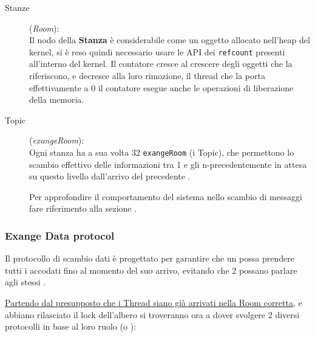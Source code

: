 \begin{description}
\item[Stanze] (\textit{Room}):\\
        Il nodo della \textbf{Stanza} è considerabile come un oggetto allocato nell'heap del kernel, si è reso
        quindi necessario usare le API dei \texttt{refcount} presenti all'interno del kernel. Il contatore cresce al
        crescere    degli oggetti che la riferiscono, e decresce alla loro rimozione, il thread che la porta
        effettivamente a 0 il contatore esegue anche le operazioni di liberazione della memoria.

\item[Topic] (\textit{exangeRoom}):\\
    Ogni stanza ha a sua volta 32 \texttt{exangeRoom} (i Topic), che permettono lo scambio effettivo delle informazioni
    tra 1 \Writer e gli n-\Reader precedentemente in attesa su questo livello dall'arrivo del precedente \Writer.

    Per approfondire il comportamento del sistema nello scambio di messaggi fare riferimento alla sezione
    .


\end{description}

\newpage

\subsubsection{Exange Data protocol} \label{exangeDataProtocol}

Il protocollo di scambio dati è progettato per garantire che un \Writer possa prendere tutti i \Reader accodati fino al
momento del suo arrivo, evitando che 2 \Writer possano parlare agli stessi \Reader.

\underline{Partendo dal presupposto che i Thread siano già arrivati nella Room corretta}, e abbiano rilasciato il lock
dell'albero si troveranno ora a dover svolgere 2 diversi protocolli in base al loro ruolo (\Writer o \Reader):

